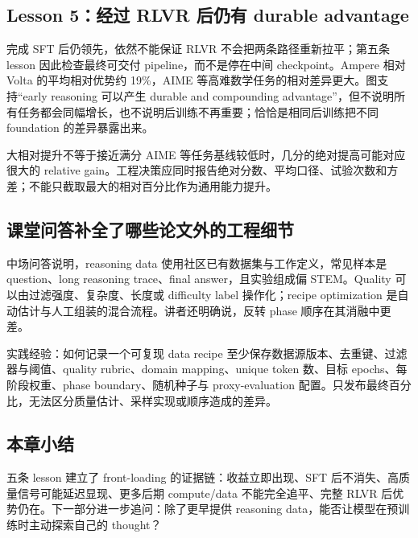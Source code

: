 \subsection{Lesson 5：经过 RLVR 后仍有 durable advantage}

完成 SFT 后仍领先，依然不能保证 RLVR 不会把两条路径重新拉平；第五条 lesson 因此检查最终可交付 pipeline，而不是停在中间 checkpoint。Ampere 相对 Volta 的平均相对优势约 19\%，AIME 等高难数学任务的相对差异更大。图支持“early reasoning 可以产生 durable and compounding advantage”，但不说明所有任务都会同幅增长，也不说明后训练不再重要；恰恰是相同后训练把不同 foundation 的差异暴露出来。


\begin{warningbox}{大相对提升不等于接近满分}
AIME 等任务基线较低时，几分的绝对提高可能对应很大的 relative gain。工程决策应同时报告绝对分数、平均口径、试验次数和方差；不能只截取最大的相对百分比作为通用能力提升。
\end{warningbox}

\subsection{课堂问答补全了哪些论文外的工程细节}

中场问答说明，reasoning data 使用社区已有数据集与工作定义，常见样本是 question、long reasoning trace、final answer，且实验组成偏 STEM。Quality 可以由过滤强度、复杂度、长度或 difficulty label 操作化；recipe optimization 是自动估计与人工组装的混合流程。讲者还明确说，反转 phase 顺序在其消融中更差。


\begin{knowledgebox}{实践经验：如何记录一个可复现 data recipe}
至少保存数据源版本、去重键、过滤器与阈值、quality rubric、domain mapping、unique token 数、目标 epochs、每阶段权重、phase boundary、随机种子与 proxy-evaluation 配置。只发布最终百分比，无法区分质量估计、采样实现或顺序造成的差异。
\end{knowledgebox}

\subsection{本章小结}

五条 lesson 建立了 front-loading 的证据链：收益立即出现、SFT 后不消失、高质量信号可能延迟显现、更多后期 compute/data 不能完全追平、完整 RLVR 后优势仍在。下一部分进一步追问：除了更早提供 reasoning data，能否让模型在预训练时主动探索自己的 thought？

